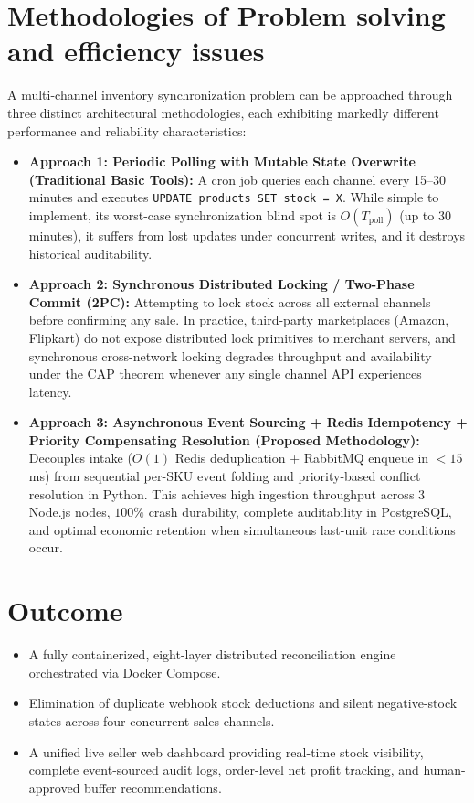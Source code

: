 \documentclass[oneside,a4paper,12pt]{report}
\begin{document}
\section{Methodologies of Problem solving and efficiency issues}
A multi-channel inventory synchronization problem can be approached through three distinct architectural methodologies, each exhibiting markedly different performance and reliability characteristics:
\begin{itemize}
  \item \textbf{Approach 1: Periodic Polling with Mutable State Overwrite (Traditional Basic Tools):} A cron job queries each channel every 15--30 minutes and executes \texttt{UPDATE products SET stock = X}. While simple to implement, its worst-case synchronization blind spot is $O(T_{\text{poll}})$ (up to 30 minutes), it suffers from lost updates under concurrent writes, and it destroys historical auditability.
  \item \textbf{Approach 2: Synchronous Distributed Locking / Two-Phase Commit (2PC):} Attempting to lock stock across all external channels before confirming any sale. In practice, third-party marketplaces (Amazon, Flipkart) do not expose distributed lock primitives to merchant servers, and synchronous cross-network locking degrades throughput and availability under the CAP theorem whenever any single channel API experiences latency.
  \item \textbf{Approach 3: Asynchronous Event Sourcing + Redis Idempotency + Priority Compensating Resolution (Proposed Methodology):} Decouples intake ($O(1)$ Redis deduplication + RabbitMQ enqueue in $<15$ ms) from sequential per-SKU event folding and priority-based conflict resolution in Python. This achieves high ingestion throughput across 3 Node.js nodes, $100\%$ crash durability, complete auditability in PostgreSQL, and optimal economic retention when simultaneous last-unit race conditions occur.
\end{itemize}

\section{Outcome}
\begin{itemize}
  \item A fully containerized, eight-layer distributed reconciliation engine orchestrated via Docker Compose.
  \item Elimination of duplicate webhook stock deductions and silent negative-stock states across four concurrent sales channels.
  \item A unified live seller web dashboard providing real-time stock visibility, complete event-sourced audit logs, order-level net profit tracking, and human-approved buffer recommendations.
\end{itemize}
\end{document}
